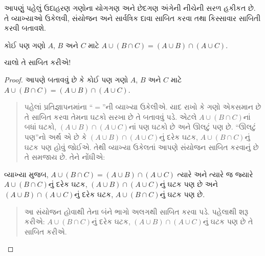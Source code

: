 \begingroup
\makeatletter{}\makeatother


\label{guunit:OLP-0607}


આપણું પહેલું ઉદાહરણ ગણોના યોગગણ અને છેદગણ અંગેની નીચેની
સરળ હકીકત છે. તે વ્યાખ્યાઓ ઉકેલવી, સંયોજન અને સાર્વત્રિક દાવા
સાબિત કરવા તથા કિસ્સાવાર સાબિતી કરવી બતાવશે.

\begin{prop}
કોઈ પણ ગણો $A$, $B$ અને $C$ માટે $A \cup (B \cap C) = (A \cup B)
\cap (A \cup C)$.
\end{prop}

ચાલો તે સાબિત કરીએ!{}

\begin{proof}
આપણે બતાવવું છે કે કોઈ પણ ગણો $A$, $B$ અને $C$ માટે $A \cup (B \cap
C) = (A \cup B) \cap (A \cup C)$.
\begin{quote}
પહેલાં પ્રતિજ્ઞાપનમાંના ``$=$''ની વ્યાખ્યા ઉકેલીએ. યાદ રાખો કે
ગણો એકસમાન છે તે સાબિત કરવા તેમના ઘટકો સરખા છે તે
બતાવવું પડે. એટલે $A \cup
(B \cap C)$નાં બધાં ઘટકો, $(A \cup B) \cap (A \cup C)$નાં
પણ ઘટકો છે અને ઊલટું પણ છે. ``ઊલટું પણ''નો અર્થ
એ છે કે $(A
\cup B) \cap (A \cup C)$નું દરેક ઘટક, $A \cup (B \cap
C)$નું ઘટક પણ હોવું જોઈએ. તેથી વ્યાખ્યા ઉકેલતાં
આપણે સંયોજન સાબિત કરવાનું છે તે સમજાય છે. તેને નોંધીએ:
\end{quote}
વ્યાખ્યા મુજબ, $A \cup (B \cap C) = (A \cup B) \cap (A \cup C)$
ત્યારે અને ત્યારે જ જ્યારે $A \cup (B \cap C)$નું દરેક
ઘટક, $(A
\cup B) \cap (A \cup C)$નું ઘટક પણ છે અને
$(A \cup B) \cap (A
\cup C)$નું દરેક ઘટક, $A \cup (B \cap C)$નું
ઘટક પણ છે.
\begin{quote}
આ સંયોજન હોવાથી તેના બંને ભાગો અલગથી સાબિત કરવા પડે.
પહેલાથી શરૂ કરીએ: $A \cup (B \cap C)$નું દરેક
ઘટક, $(A
\cup B) \cap (A \cup C)$નું ઘટક પણ છે તે સાબિત કરીએ.


\end{quote}
\end{proof}
